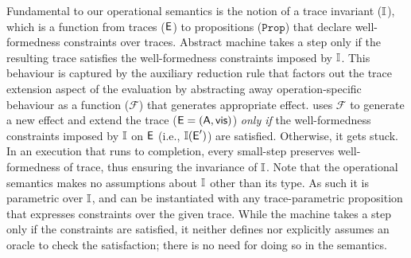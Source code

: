 Fundamental to our operational semantics is the notion of a trace
invariant ($\mathbb{I}$), which is a function from traces ($\textsf{E}$) to
propositions ($\texttt{Prop}$) that declare well-formedness
constraints over traces. Abstract machine takes a step only if the
resulting trace satisfies the well-formedness constraints imposed by
$\mathbb{I}$. This behaviour is captured by the auxiliary reduction rule
 that factors out the trace extension aspect of the
evaluation by abstracting away operation-specific behaviour as a
function ($\mathcal{F}$) that generates appropriate effect.
 uses $\mathcal{F}$ to generate a new effect and
extend the trace ($\textsf{E} = (\textsf{A},\textsf{vis})$) \emph{only if} the
well-formedness constraints imposed by $\mathbb{I}$ on $\textsf{E}$ (i.e., $\mathbb{I}(\textsf{E}')$)
are satisfied. Otherwise, it gets stuck. In an execution that runs to
completion, every small-step preserves well-formedness of trace, thus
ensuring the invariance of $\mathbb{I}$. Note that the operational semantics
makes no assumptions about $\mathbb{I}$ other than its type. As such it is
parametric over $\mathbb{I}$, and can be instantiated with any
trace-parametric proposition that expresses constraints over the given
trace. While the machine takes a step only if the constraints are
satisfied, it neither defines nor explicitly assumes an oracle to
check the satisfaction; there is no need for doing so in the
semantics.


